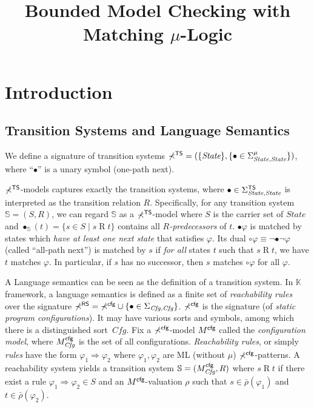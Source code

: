 \documentclass{article}
\title{Bounded Model Checking with \\Matching $\mu$-Logic}
\author{}
\date{}
\newcommand{\To}{\Rightarrow}
\newcommand{\sig}{\mathbb{\Sigma}}
\newcommand{\rhobar}{\bar{\rho}}
\newcommand{\K}{$\mathbb{K}$\xspace} %
\newcommand{\Rbin}{\mathbin{R}}
\newcommand{\wnext}{{\circ}}
\newcommand{\snext}{{\bullet}}
\newcommand{\TS}{\textnormal{\textsf{TS}\xspace}}
\newcommand{\cfg}{\textnormal{\textsf{cfg}\xspace}}
\newcommand{\RS}{\textnormal{\textsf{RS}\xspace}}
\newcommand{\Cfg}{\mathit{Cfg}}
\newcommand{\State}{\textit{State}}
\newcommand{\Sbb}{\mathbb{S}}
\begin{document}
\maketitle

\section{Introduction}
\subsection{Transition Systems and Language Semantics}
We define a signature of transition systems $\sig^\TS = ( \{ \State \} , \{ \snext \in \Sigma^\mu_{\State,\State} \} )$,
where ``$\snext$'' is a unary symbol (one-path next).

$\sig^\TS$-models captures exactly the transition systems,
where $\snext \in \Sigma^\TS_{\State,\State}$ is interpreted as the
transition relation $R$.
Specifically, for any transition system
$\Sbb = (S,R)$, we can regard $\Sbb$ as a $\sig^\TS$-model
where $S$ is the carrier set of $\State$ and
$\snext_\Sbb(t) = \{ s \in S \mid s \mathbin{R} t \}$ contains
all \emph{$R$-predecessors} of $t$.
$\snext \varphi$ is matched by states which
\emph{have at least one next state} that satisfies
$\varphi$.
Its dual $\wnext \varphi \equiv \neg \snext \neg \varphi$ (called ``all-path next'')
is matched by $s$ if \emph{for all} states $t$ such that $s \mathbin{R} t$,
we have $t$ matches $\varphi$. In particular, if $s$ has no successor,
then $s$ matches $\wnext \varphi$ for all $\varphi$.

A Language semantics can be seen as the definition of a transition system.
In \K framework, a language semantics is defined as a finite set of \emph{reachability rules} over the signature
$\sig^\RS = \sig^\cfg \cup \{ \snext \in \Sigma_{ \Cfg , \Cfg } \} $.
$\sig^\cfg$ is the signature (of \emph{static program configurations}). 
It may have various sorts and symbols, among which there is a distinguished sort~$\Cfg$.
Fix a $\sig^\cfg$-model $M^\cfg$ called the \emph{configuration model},
where $M^\cfg_\Cfg$ is the set of all configurations.
\emph{Reachability rules}, or simply \emph{rules} have the form
$\varphi_1 \To \varphi_2$ where $\varphi_1,\varphi_2$ are ML (without $\mu$) 
$\sig^\cfg$-patterns.
A reachability system yields a transition system $\Sbb = (M^\cfg_\Cfg,R)$ where
$s \Rbin t$ if there exist a rule $\varphi_1 \To \varphi_2 \in S$
and an $M^\cfg$-valuation $\rho$ such that
$s \in \rhobar(\varphi_1)$ and $t \in \rhobar(\varphi_2)$.
\end{document}
